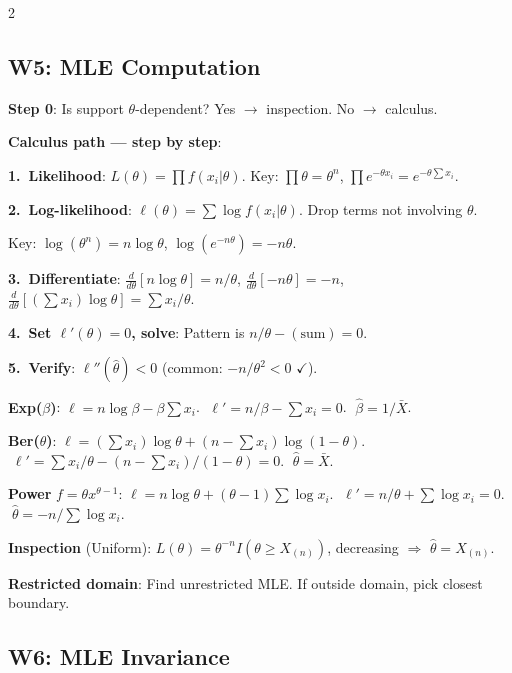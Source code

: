 \documentclass[8pt]{extarticle}
\begin{document}
\begin{multicols}{2}
\subsection{W5: MLE Computation}

\textbf{Step 0}: Is support $\theta$-dependent? Yes $\to$ inspection. No $\to$ calculus.

\textbf{Calculus path --- step by step}:

\textbf{1.\ Likelihood}: $L(\theta) = \prod f(x_i|\theta)$. Key: $\prod\theta = \theta^n$, \; $\prod e^{-\theta x_i} = e^{-\theta\sum x_i}$.

\textbf{2.\ Log-likelihood}: $\ell(\theta) = \sum\log f(x_i|\theta)$. Drop terms not involving $\theta$.

Key: $\log(\theta^n) = n\log\theta$, \; $\log(e^{-n\theta}) = -n\theta$.

\textbf{3.\ Differentiate}: $\frac{d}{d\theta}[n\log\theta] = n/\theta$, \; $\frac{d}{d\theta}[-n\theta] = -n$, \; $\frac{d}{d\theta}[(\sum x_i)\log\theta] = \sum x_i/\theta$.

\textbf{4.\ Set $\ell'(\theta) = 0$, solve}: Pattern is $n/\theta - (\text{sum}) = 0$.

\textbf{5.\ Verify}: $\ell''(\hat\theta) < 0$ (common: $-n/\theta^2 < 0$ $\checkmark$).

\medskip

\textbf{Exp($\beta$)}: $\ell = n\log\beta - \beta\sum x_i$. $\;\ell' = n/\beta - \sum x_i = 0$. $\;\hat\beta = 1/\bar X$.

\textbf{Ber($\theta$)}: $\ell = (\sum x_i)\log\theta + (n{-}\sum x_i)\log(1{-}\theta)$. $\;\ell' = \sum x_i/\theta - (n{-}\sum x_i)/(1{-}\theta) = 0$. $\;\hat\theta = \bar X$.

\textbf{Power} $f = \theta x^{\theta-1}$: $\ell = n\log\theta + (\theta{-}1)\sum\log x_i$. $\;\ell' = n/\theta + \sum\log x_i = 0$. $\;\hat\theta = -n/\sum\log x_i$.

\medskip

\textbf{Inspection} (Uniform): $L(\theta) = \theta^{-n}I(\theta\ge X_{(n)})$, decreasing $\Rightarrow$ $\hat\theta = X_{(n)}$.

\textbf{Restricted domain}: Find unrestricted MLE. If outside domain, pick closest boundary.

\subsection{W6: MLE Invariance}


\end{multicols}
\end{document}
